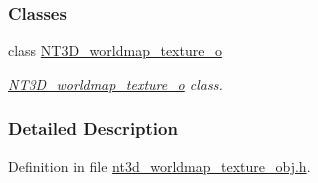 \subsubsection*{Classes}
\begin{DoxyCompactItemize}
\item 
class \hyperlink{class_n_t3_d__worldmap__texture__o}{NT3D\_\-worldmap\_\-texture\_\-o}
\begin{DoxyCompactList}\small\item\em \hyperlink{class_n_t3_d__worldmap__texture__o}{NT3D\_\-worldmap\_\-texture\_\-o} class. \item\end{DoxyCompactList}\end{DoxyCompactItemize}


\subsubsection{Detailed Description}


Definition in file \hyperlink{nt3d__worldmap__texture__obj_8h_source}{nt3d\_\-worldmap\_\-texture\_\-obj.h}.

